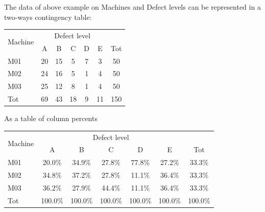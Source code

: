 \begin{frame}
  \vspace{0.5cm}
  The data of above example on Machines and Defect levels can be represented in a two-ways contingency table:
  \vspace{1cm}
  \begin{center}
    \begin{tabular}{|l|c|c|c|c|c|c|}
      \hline      
      \multirow{2}{*}{\parbox{1.5cm}{Machine}}& \multicolumn{5}{c|}{Defect level}& \\
      \cline{2-6}
      & A&B&C&D&E &Tot\\
      \hline
      M01&20&15&5&7&3&50\\	
      \hline
      M02&24&16&5&1&4&50\\
      \hline
      M03&25&12&8&1&4&50\\
      \hline
      Tot&69&43&18&9&11&150\\
      \hline
   \end{tabular}
  \end{center}
\end{frame}


\begin{frame}
  \vspace{0.5cm}
  As a table of column percents
  \vspace{1cm}
  \begin{center}
     \begin{tabular}{|l|c|c|c|c|c|c|}
      \hline      
      \multirow{2}{*}{\parbox{1.5cm}{Machine}}& \multicolumn{5}{c|}{Defect level}& \\
      \cline{2-6}
      & A&B&C&D&E &Tot\\
      \hline
      M01& 20.0\% &34.9\% &27.8\% &77.8\% &27.2\% &33.3\%\\
      \hline
      M02&34.8\% &37.2\% &27.8\%&11.1\%&36.4\%&33.3\%\\
      \hline
      M03&36.2\% &27.9\% &44.4\% &11.1\% &36.4\% &33.3\%\\
      \hline
     Tot& 100.0\% &100.0\% &100.0\% &100.0\% &100.0\% &100.0\%\\
      \hline
    \end{tabular}
  \end{center}
\end{frame}

